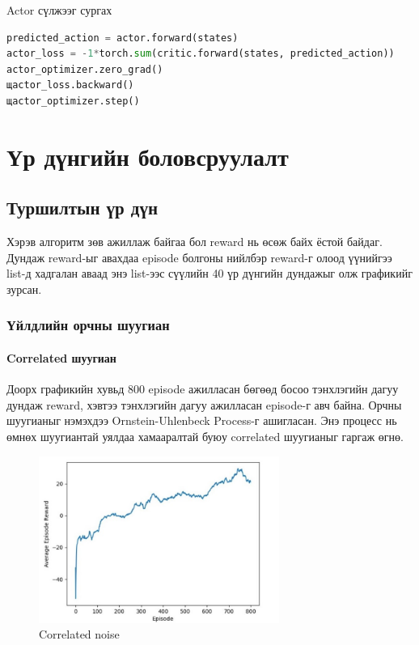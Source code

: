 \documentclass[12pt,A4]{report}
\begin{document}
Actor сүлжээг сургах

\begin{lstlisting}[language=Python, caption=Actor сүлжээг сургах, frame=single]
predicted_action = actor.forward(states)
actor_loss = -1*torch.sum(critic.forward(states, predicted_action))
actor_optimizer.zero_grad()
щactor_loss.backward()
щactor_optimizer.step()
\end{lstlisting}

\chapter{Үр дүнгийн боловсруулалт}

\section{Туршилтын үр дүн}

Хэрэв алгоритм зөв ажиллаж байгаа бол reward нь өсөж байх ёстой байдаг. Дундаж reward-ыг авахдаа episode болгоны нийлбэр reward-г олоод үүнийгээ list-д хадгалан аваад энэ list-ээс сүүлийн 40 үр дүнгийн дундажыг олж графикийг зурсан.

\subsection{Үйлдлийн орчны шуугиан}

\subsubsection{Correlated шуугиан}

Доорх графикийн хувьд 800 episode ажилласан бөгөөд босоо тэнхлэгийн дагуу дундаж reward, хэвтээ тэнхлэгийн дагуу ажилласан episode-г авч байна. Орчны шуугианыг нэмэхдээ Ornstein-Uhlenbeck Process-г ашигласан. Энэ процесс нь өмнөх шуугиантай уялдаа хамааралтай буюу correlated шуугианыг гаргаж өгнө.

\begin{figure}[H]
\centering
\includegraphics[width=0.7\textwidth]{./images/after_800_ep}
\caption{Correlated noise}
\end{figure}
\end{document}

